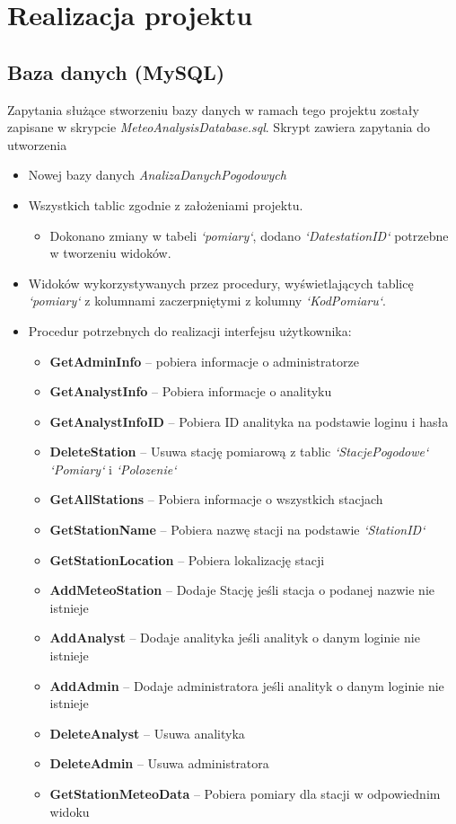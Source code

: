 \documentclass[12pt,a4paper]{article}
\begin{document}
\section{Realizacja projektu}
\subsection{Baza danych (MySQL)}
Zapytania służące stworzeniu bazy danych w ramach tego projektu zostały zapisane w skrypcie \textit{MeteoAnalysisDatabase.sql}. Skrypt zawiera zapytania do utworzenia
\begin{itemize}
\item Nowej bazy danych \textit{AnalizaDanychPogodowych}
\item Wszystkich tablic zgodnie z założeniami projektu.
\begin{itemize}
\item Dokonano zmiany w tabeli \textit{`pomiary`}, dodano \textit{`DatestationID`} potrzebne w tworzeniu widoków.
\end{itemize}
\item Widoków wykorzystywanych przez procedury, wyświetlających tablicę \textit{`pomiary`} z kolumnami zaczerpniętymi z kolumny \textit{`KodPomiaru`}.
\item Procedur potrzebnych do realizacji interfejsu użytkownika:
\begin{small}
\begin{itemize}
\item \textbf{GetAdminInfo} -- pobiera informacje o administratorze
\item \textbf{GetAnalystInfo} -- Pobiera informacje o analityku
\item \textbf{GetAnalystInfoID} -- Pobiera ID analityka na podstawie loginu i hasła
\item \textbf{DeleteStation} -- Usuwa stację pomiarową z tablic \textit{`StacjePogodowe`} \textit{`Pomiary`} i \textit{`Polozenie`}
\item \textbf{GetAllStations} -- Pobiera informacje o wszystkich stacjach
\item \textbf{GetStationName} -- Pobiera nazwę stacji na podstawie \textit{`StationID`}
\item \textbf{GetStationLocation} -- Pobiera lokalizację stacji
\item \textbf{AddMeteoStation} -- Dodaje Stację jeśli stacja o podanej nazwie nie istnieje
\item \textbf{AddAnalyst} -- Dodaje analityka jeśli analityk o danym loginie nie istnieje
\item \textbf{AddAdmin} -- Dodaje administratora jeśli analityk o danym loginie nie istnieje
\item \textbf{DeleteAnalyst} -- Usuwa analityka
\item \textbf{DeleteAdmin }-- Usuwa administratora
\item \textbf{GetStationMeteoData} -- Pobiera pomiary dla stacji w odpowiednim widoku
\end{itemize}
\end{small}
\end{itemize}
\end{document}
